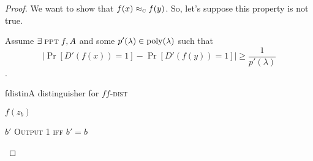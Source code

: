 \begin{proof}
    We want to show that $f(x) \approx_\textsc{c} f(y)$. So, let's suppose this property is not true.

    Assume $\exists\; \textsc{ppt}\; f, A$ and some $p'(\lambda) \in \mathrm{poly}(\lambda) $ such that
    \begin{equation}
        \left| \Pr[D'(f(x)) = 1] - \Pr[D'(f(y)) = 1] \right| \geq \frac{1}{p'(\lambda)}
    \end{equation}.

    \begin{cryptogame}{fdistin}{A distinguisher for $f$}{$f$-\textsc{dist}}

        {$f(z_b)$}
        {}

        \postlevel

        \send{}
        {$b'$}
        {\textsc{Output 1 iff} $b' = b$}

    \end{cryptogame}

    \begin{figure}
        \centering
        \sdinit{}
\end{figure}
\end{proof}
